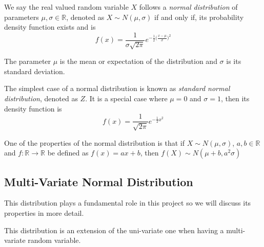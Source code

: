 \begin{definition}
  We say the real valued random variable \(X\) follows a \emph{normal distribution} of
  parameters \(\mu, \sigma \in \mathbb{R}\), denoted as \(X \sim N(\mu,
  \sigma)\) if and only if, its probability density function exists and is
  \[
    f(x) = \frac{1}{\sigma \sqrt{2\pi}} e^{-\frac{1}{2}\big(\frac{x-\mu}{\sigma} \big)^2}
  \]

  The parameter \(\mu\) is the mean or expectation of the distribution and
  \(\sigma\) is its standard deviation.

\end{definition}

The simplest case of a normal distribution is known as \emph{standard normal
  distribution}, denoted as \(Z\). It is a special case where \(\mu = 0\) and \(\sigma = 1\), then
its density function is
\[
  f(x) = \frac{1}{\sqrt{2\pi}}e^{-\frac{1}{2}x^2}
\]

One of the properties of the normal distribution is that if \(X \sim N(\mu, \sigma)\), \(a,b \in \mathbb{R}\) and \(f:\mathbb{R} \to \mathbb{R}\) be defined
as \(f(x) = ax + b\), then \(f(X) \sim N(\mu + b, a^2 \sigma)\)

\subsection{Multi-Variate Normal Distribution}

This distribution plays a fundamental role in this project so we will discuss
its properties in more detail.

This distribution is an extension of the uni-variate one when having a
multi-variate random variable.

